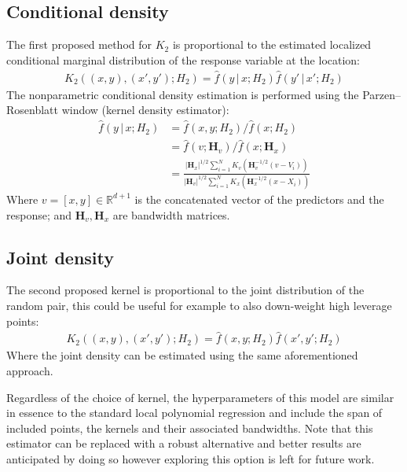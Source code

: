 \documentclass[preprint,1p,times]{elsarticle}
\begin{document}
\subsection*{Conditional density} 
The first proposed method for $K_2$ is proportional to the estimated localized conditional marginal distribution of the response variable at the location:
\begin{align}
K_2 \left((x,y),(x', y') ; H_2 \right) = \hat{f}(y \, | \, x ; H_2) \hat{f}(y' \, | \, x'; H_2)
\label{cond_kernel_def}
\end{align}
The nonparametric conditional density estimation is performed using the Parzen–Rosenblatt window (kernel density estimator):
\begin{align}
\hat{f}(y \, | \, x; H_2) &= \hat{f} (x, y ; H_2) / \hat{f} (x; H_2) \\
&= \hat{f} (v ; \mathbf{H}_v) / \hat{f} (x; \mathbf{H}_x) \\
&= \frac{|\mathbf{H}_x|^{1/2} \sum_{i=1}^N K_v \left( \mathbf{H}_v^{-1/2} (v - V_i) \right)} {|\mathbf{H}_v|^{1/2} \sum_{i=1}^N K_x \left( \mathbf{H}_x^{-1/2} (x - X_i) \right)}
\label{conditional_prob_est}
\end{align}
Where $v=[x,y] \in \mathbb{R}^{d+1}$ is the concatenated vector of the predictors and the response; and $\mathbf{H}_v, \mathbf{H}_x$ are bandwidth matrices.
\subsection*{Joint density}
The second proposed kernel is proportional to the joint distribution of the random pair, this could be useful for example to also down-weight high leverage points:
\begin{align}
K_2 \left((x,y),(x', y') ; H_2 \right) = \hat{f}(x,y ; H_2) \hat{f}(x',y'; H_2)
\label{joint_kernel_def}
\end{align}
Where the joint density can be estimated using the same aforementioned approach. \newline

Regardless of the choice of kernel, the hyperparameters of this model are similar in essence to the standard local polynomial regression and include the span of included points, the kernels and their associated bandwidths. Note that this estimator can be replaced with a robust alternative and better results are anticipated by doing so however exploring this option is left for future work.
\end{document}
